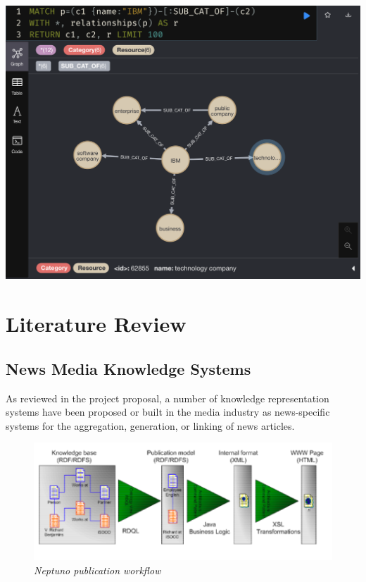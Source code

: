 \documentclass[11pt]{article}
\begin{document}
\begin{enumerate}
{    \centerline{\includegraphics[scale=0.3]{use-case-5b}}
    }
\end{enumerate}


\newpage


\section{Literature Review}

\label{sec:LiteratureReview}

  \subsection{News Media Knowledge Systems}

  As reviewed in the project proposal\cite{ek-proposal}, a number of knowledge representation systems have been proposed or built in the media industry as news-specific systems for the aggregation, generation, or linking of news articles. 

  \begin{figure}
    \centerline{\includegraphics[scale=0.4]{literature-review--neptuno.png}}
    \caption{\textit{Neptuno publication workflow}}
  \end{figure}
\end{document}
